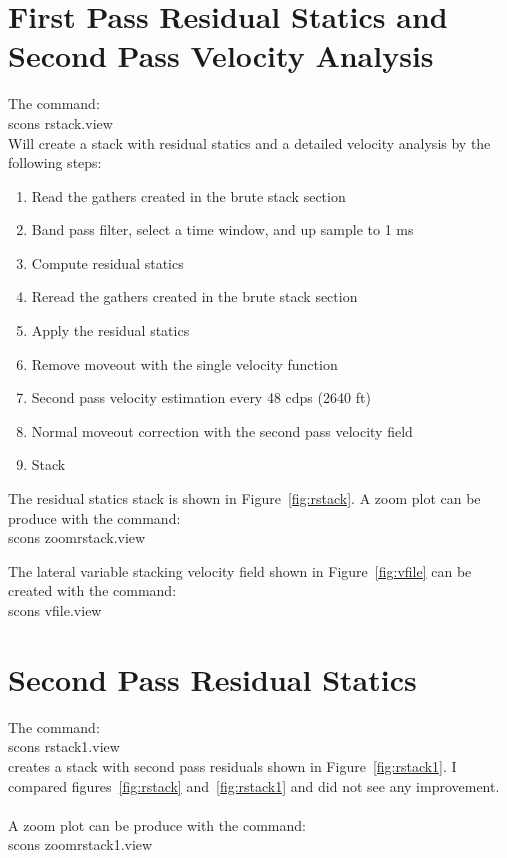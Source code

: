 \section{First Pass Residual Statics and Second Pass Velocity Analysis}
The command:\\
scons rstack.view\\
Will create a stack with residual statics and a detailed velocity analysis 
by the following steps:
\begin{enumerate}
\item Read the gathers created in the brute stack section
\item Band pass filter, select a time window, and up sample to 1 ms
\item Compute residual statics
\item Reread the gathers created in the brute stack section
\item Apply the residual statics
\item Remove moveout with the single velocity function 
\item Second pass velocity estimation every 48 cdps (2640 ft)
\item Normal moveout correction with the second pass velocity field 
\item Stack
\end{enumerate}

The residual statics stack is shown in Figure~\ref{fig:rstack}.  A zoom 
plot can be produce with the command:\\
scons zoomrstack.view


The lateral variable stacking velocity field shown in Figure~\ref{fig:vfile} 
can be created with the command:\\
scons vfile.view


\section{Second Pass Residual Statics}
The command:\\
scons rstack1.view\\
creates a stack with second pass residuals shown in Figure~\ref{fig:rstack1}.  
I compared figures~\ref{fig:rstack} and~\ref{fig:rstack1} and did not see 
any improvement.\\
\\  
A zoom plot can be produce with the command:\\
scons zoomrstack1.view

